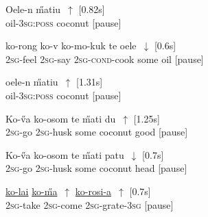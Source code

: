 \documentclass[output=paper]{LSP/langsci}
\begin{document}
 \begin{exe}
\ex \label{Guapp1}
\gll    Oele-n          \H{m}atiu~$\uparrow$ [0.82s]\\     	       
 oil-\textsc{3sg:poss} coconut [pause]\\
\glt {} 
\end{exe}

 \begin{exe}
\ex \label{Guapp2}
\gll    ko-rong        ko-v       ko-mo-kuk           te      oele~$\downarrow$ [0.6s]\\     	       
\textsc{2sg}-feel     \textsc{2sg}-say   \textsc{2sg-cond}-cook   some    oil [pause]\\
\glt {} 
\end{exe}

  \begin{exe}
\ex \label{Guapp3}
\gll    oele-n          \H{m}atiu~$\uparrow$ [1.31s]\\     	       
 oil-\textsc{3sg:poss} coconut [pause]\\
\glt {} 
\end{exe}


  \begin{exe}
\ex \label{Guapp4}
\gll    Ko-\H{v}a        ko-osom         te      \H{m}ati        du~$\uparrow$ [1.25s]\\     	       
 \textsc{2sg}-go    \textsc{2sg}-husk      some    coconut   good [pause]\\
\glt {} 
\end{exe}


  \begin{exe}
\ex \label{Guapp5}
\gll    Ko-\H{v}a        ko-osom         te      \H{m}ati        patu~$\downarrow$ [0.7s]\\     	       
 \textsc{2sg}-go    \textsc{2sg}-husk      some    coconut   head [pause]\\
\glt {} 
\end{exe}

  \begin{exe}
\ex \label{Guapp6}
\gll    \underline{ko-lai}      \underline{ko-\H{m}a}~$\uparrow$       \underline{ko-rosi-a}~$\uparrow$ [0.7s]\\     	       
 \textsc{2sg}-take   \textsc{2sg}-come   \textsc{2sg}-grate-\textsc{3sg} [pause]\\
\glt {} 
\end{exe}
\end{document}
